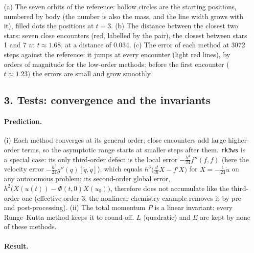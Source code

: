\documentclass[11pt,a4paper]{article}
\begin{document}
(a) The seven orbits of the reference: hollow circles are the starting
positions, numbered by body (the number is also the mass, and the line
width grows with it), filled dots the positions at $t = 3$. (b) The distance
between the closest two stars: seven close encounters (red, labelled by the
pair), the closest between stars 1 and 7 at $t \approx 1.68$, at a distance
of $0.034$. (c) The error of each method at 3072 steps against the
reference: it jumps at every encounter (light red lines), by orders of
magnitude for the low-order methods; before the first encounter
($t \approx 1.23$) the errors are small and grow smoothly.

\newpage
\subsection*{3. Tests: convergence and the invariants}

\paragraph{Prediction.} (i) Each method converges at its general order;
close encounters add large higher-order terms, so the asymptotic range
starts at smaller steps after them. \texttt{rk3ws} is a special case: its
only third-order defect is the local error $-\tfrac{h^3}{24}f''(f,f)$ (here
the velocity error $-\tfrac{h^3}{24}g''(q)[\dot q, \dot q]$), which equals
$h^3\bigl(\tfrac{d}{dt}X - f'X\bigr)$ for $X = -\tfrac1{24}\ddot u$ on any
autonomous problem; its second-order global error,
$h^2\bigl(X(u(t)) - \Phi(t,0)X(u_0)\bigr)$, therefore does not accumulate
like the third-order one (effective order 3; the nonlinear chemistry example
removes it by pre- and post-processing). (ii) The total momentum $P$ is a linear
invariant: every Runge--Kutta method keeps it to round-off. $L$ (quadratic)
and $E$ are kept by none of these methods.

\paragraph{Result.}
\begin{center}
\small

\end{center}
\end{document}
